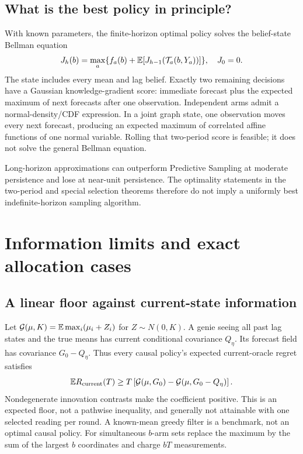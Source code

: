 \subsection{What is the best policy in principle?}
With known parameters, the finite-horizon optimal policy solves the belief-state Bellman equation
\begin{equation}
J_h(b)=\max_a\{f_a(b)+\mathbb E[J_{h-1}(\mathcal T_a(b,Y_a))]\},\quad J_0=0.
\end{equation}
The state includes every mean and lag belief. Exactly two remaining decisions have a Gaussian knowledge-gradient score: immediate forecast plus the expected maximum of next forecasts after one observation. Independent arms admit a normal-density/CDF expression. In a joint graph state, one observation moves every next forecast, producing an expected maximum of correlated affine functions of one normal variable. Rolling that two-period score is feasible; it does not solve the general Bellman equation.

Long-horizon approximations can outperform Predictive Sampling at moderate persistence and lose at near-unit persistence. The optimality statements in the two-period and special selection theorems therefore do not imply a uniformly best indefinite-horizon sampling algorithm.

\section{Information limits and exact allocation cases}

\subsection{A linear floor against current-state information}
Let $\mathcal G(\mu,K)=\mathbb E\max_i(\mu_i+Z_i)$ for $Z\sim N(0,K)$. A genie seeing all past lag states and the true means has current conditional covariance $Q_\eta$. Its forecast field has covariance $G_0-Q_\eta$. Thus every causal policy's expected current-oracle regret satisfies
\begin{equation}
\mathbb E R_{\rm current}(T)\ge T\left[\mathcal G(\mu,G_0)-\mathcal G(\mu,G_0-Q_\eta)\right].
\end{equation}
Nondegenerate innovation contrasts make the coefficient positive. This is an expected floor, not a pathwise inequality, and generally not attainable with one selected reading per round. A known-mean greedy filter is a benchmark, not an optimal causal policy. For simultaneous $b$-arm sets replace the maximum by the sum of the largest $b$ coordinates and charge $bT$ measurements.

